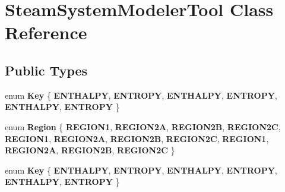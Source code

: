 \hypertarget{class_steam_system_modeler_tool}{}\section{Steam\+System\+Modeler\+Tool Class Reference}
\label{class_steam_system_modeler_tool}
\subsection*{Public Types}
\begin{DoxyCompactItemize}
\item 
\mbox{\label{class_steam_system_modeler_tool_aed38516c350ca4ecf17b545e07d41dcd}} 
enum {\bfseries Key} \{ \newline
{\bfseries E\+N\+T\+H\+A\+L\+PY}, 
{\bfseries E\+N\+T\+R\+O\+PY}, 
{\bfseries E\+N\+T\+H\+A\+L\+PY}, 
{\bfseries E\+N\+T\+R\+O\+PY}, 
\newline
{\bfseries E\+N\+T\+H\+A\+L\+PY}, 
{\bfseries E\+N\+T\+R\+O\+PY}
 \}
\item 
\mbox{\label{class_steam_system_modeler_tool_a162eeadc7eb56a9b50b7a8f630eb8f05}} 
enum {\bfseries Region} \{ \newline
{\bfseries R\+E\+G\+I\+O\+N1}, 
{\bfseries R\+E\+G\+I\+O\+N2A}, 
{\bfseries R\+E\+G\+I\+O\+N2B}, 
{\bfseries R\+E\+G\+I\+O\+N2C}, 
\newline
{\bfseries R\+E\+G\+I\+O\+N1}, 
{\bfseries R\+E\+G\+I\+O\+N2A}, 
{\bfseries R\+E\+G\+I\+O\+N2B}, 
{\bfseries R\+E\+G\+I\+O\+N2C}, 
\newline
{\bfseries R\+E\+G\+I\+O\+N1}, 
{\bfseries R\+E\+G\+I\+O\+N2A}, 
{\bfseries R\+E\+G\+I\+O\+N2B}, 
{\bfseries R\+E\+G\+I\+O\+N2C}
 \}
\item 
\mbox{\label{class_steam_system_modeler_tool_aed38516c350ca4ecf17b545e07d41dcd}} 
enum {\bfseries Key} \{ \newline
{\bfseries E\+N\+T\+H\+A\+L\+PY}, 
{\bfseries E\+N\+T\+R\+O\+PY}, 
{\bfseries E\+N\+T\+H\+A\+L\+PY}, 
{\bfseries E\+N\+T\+R\+O\+PY}, 
\newline
{\bfseries E\+N\+T\+H\+A\+L\+PY}, 
{\bfseries E\+N\+T\+R\+O\+PY}
 \}
\item 
\mbox{\label{class_steam_system_modeler_tool_a162eeadc7eb56a9b50b7a8f630eb8f05}} 

\end{DoxyCompactItemize}
